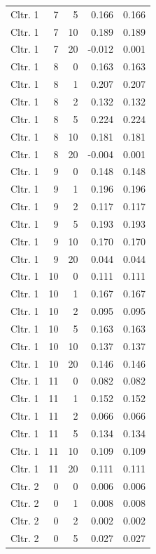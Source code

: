 \begin{longtable}{lrrrr}
  Cltr. 1 &    7 &    5 & 0.166 & 0.166 \\ 
  Cltr. 1 &    7 &   10 & 0.189 & 0.189 \\ 
  Cltr. 1 &    7 &   20 & -0.012 & 0.001 \\ 
  Cltr. 1 &    8 &    0 & 0.163 & 0.163 \\ 
  Cltr. 1 &    8 &    1 & 0.207 & 0.207 \\ 
  Cltr. 1 &    8 &    2 & 0.132 & 0.132 \\ 
  Cltr. 1 &    8 &    5 & 0.224 & 0.224 \\ 
  Cltr. 1 &    8 &   10 & 0.181 & 0.181 \\ 
  Cltr. 1 &    8 &   20 & -0.004 & 0.001 \\ 
  Cltr. 1 &    9 &    0 & 0.148 & 0.148 \\ 
  Cltr. 1 &    9 &    1 & 0.196 & 0.196 \\ 
  Cltr. 1 &    9 &    2 & 0.117 & 0.117 \\ 
  Cltr. 1 &    9 &    5 & 0.193 & 0.193 \\ 
  Cltr. 1 &    9 &   10 & 0.170 & 0.170 \\ 
  Cltr. 1 &    9 &   20 & 0.044 & 0.044 \\ 
  Cltr. 1 &   10 &    0 & 0.111 & 0.111 \\ 
  Cltr. 1 &   10 &    1 & 0.167 & 0.167 \\ 
  Cltr. 1 &   10 &    2 & 0.095 & 0.095 \\ 
  Cltr. 1 &   10 &    5 & 0.163 & 0.163 \\ 
  Cltr. 1 &   10 &   10 & 0.137 & 0.137 \\ 
  Cltr. 1 &   10 &   20 & 0.146 & 0.146 \\ 
  Cltr. 1 &   11 &    0 & 0.082 & 0.082 \\ 
  Cltr. 1 &   11 &    1 & 0.152 & 0.152 \\ 
  Cltr. 1 &   11 &    2 & 0.066 & 0.066 \\ 
  Cltr. 1 &   11 &    5 & 0.134 & 0.134 \\ 
  Cltr. 1 &   11 &   10 & 0.109 & 0.109 \\ 
  Cltr. 1 &   11 &   20 & 0.111 & 0.111 \\ 
  Cltr. 2 &    0 &    0 & 0.006 & 0.006 \\ 
  Cltr. 2 &    0 &    1 & 0.008 & 0.008 \\ 
  Cltr. 2 &    0 &    2 & 0.002 & 0.002 \\ 
  Cltr. 2 &    0 &    5 & 0.027 & 0.027 \\ 

\end{longtable}
